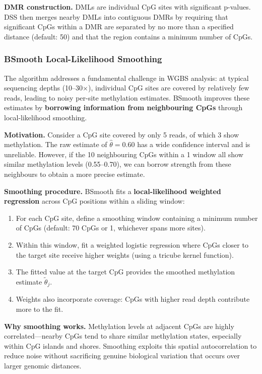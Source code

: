 \textbf{DMR construction.} DMLs are individual CpG sites with significant p-values. DSS then merges nearby DMLs into contiguous DMRs by requiring that significant CpGs within a DMR are separated by no more than a specified distance (default: 50\basepair{}) and that the region contains a minimum number of CpGs.

\subsubsection{BSmooth Local-Likelihood Smoothing}
\label{subsubsec:methylation:bsmooth}

The  algorithm addresses a fundamental challenge in WGBS analysis: at typical sequencing depths (10--30$\times$), individual CpG sites are covered by relatively few reads, leading to noisy per-site methylation estimates. BSmooth improves these estimates by \textbf{borrowing information from neighbouring CpGs} through local-likelihood smoothing.

\textbf{Motivation.} Consider a CpG site covered by only 5 reads, of which 3 show methylation. The raw estimate of $\hat{\theta} = 0.60$ has a wide confidence interval and is unreliable. However, if the 10 neighbouring CpGs within a 1\kilobase{} window all show similar methylation levels (0.55--0.70), we can borrow strength from these neighbours to obtain a more precise estimate.

\textbf{Smoothing procedure.} BSmooth fits a \textbf{local-likelihood weighted regression} across CpG positions within a sliding window:
\begin{enumerate}[itemsep=2pt]
  \item For each CpG site, define a smoothing window containing a minimum number of CpGs (default: 70 CpGs or 1\kilobase{}, whichever spans more sites).
  \item Within this window, fit a weighted logistic regression where CpGs closer to the target site receive higher weights (using a tricube kernel function).
  \item The fitted value at the target CpG provides the smoothed methylation estimate $\tilde{\theta}_j$.
  \item Weights also incorporate coverage: CpGs with higher read depth contribute more to the fit.
\end{enumerate}

\textbf{Why smoothing works.} Methylation levels at adjacent CpGs are highly correlated---nearby CpGs tend to share similar methylation states, especially within CpG islands and shores. Smoothing exploits this spatial autocorrelation to reduce noise without sacrificing genuine biological variation that occurs over larger genomic distances.

